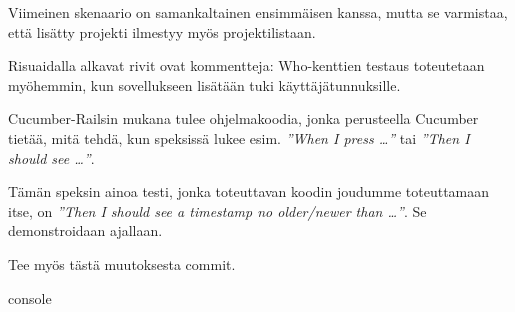 \documentclass{article}
\newcommand{\pdfforeignlanguage}[2]{\texorpdfstring{\foreignlanguage{#1}{#2}}{#2}}
\newcommand{\eng}[1]{\pdfforeignlanguage{english}{#1}}
\begin{document}
Viimeinen skenaario on samankaltainen ensimmäisen kanssa, mutta se varmistaa,
että lisätty projekti ilmestyy myös projektilistaan.

Risuaidalla alkavat rivit ovat kommentteja: \eng{Who}-kenttien testaus
toteutetaan myöhemmin, kun sovellukseen lisätään tuki käyttäjätunnuksille.

Cucumber-Railsin mukana tulee ohjelmakoodia, jonka perusteella \eng{Cucumber}
tietää, mitä tehdä, kun speksissä lukee esim. \emph{''\eng{When I press
\dots}''} tai \emph{''\eng{Then I should see \dots}''}.

Tämän speksin ainoa testi, jonka toteuttavan koodin joudumme toteuttamaan itse,
on \emph{''\eng{Then I should see a timestamp no older/newer than \dots}''}. Se
demonstroidaan ajallaan.

\begin{samepage}
Tee myös tästä muutoksesta commit.

\begin{pygmented}{console}
\end{pygmented}
\end{samepage}
\end{document}
